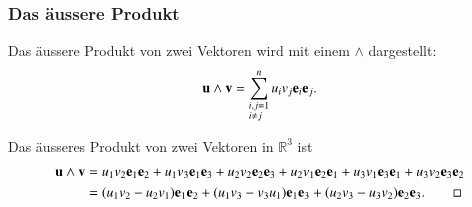 \subsubsection{Das äussere Produkt}
Das äussere Produkt von zwei Vektoren wird mit einem $\wedge$ dargestellt:
\begin{equation*}
    \textbf{u}\wedge \textbf{v} 
    = 
    \sum_{\begin{subarray}{l}i,j=1\\i \neq j\end{subarray}}^n  u_iv_j\textbf{e}_i\textbf{e}_j .
\end{equation*}
\begin{beispiel}
Das äusseres Produkt von zwei Vektoren in $\mathbb{R}^3$ ist
\begin{align*}
		\textbf{u} \wedge \textbf{v}
		&= 
		u_1v_2\textbf{e}_1\textbf{e}_2 
		+ 
		u_1v_3\textbf{e}_1\textbf{e}_3 
		+ 
		u_2v_2\textbf{e}_2\textbf{e}_3 
		+ 
		u_2v_1\textbf{e}_2\textbf{e}_1 
		+ 
		u_3v_1\textbf{e}_3\textbf{e}_1 
		+
		u_3v_2\textbf{e}_3\textbf{e}_2 \\\ 
		&= 
		(u_1v_2 - u_2v_1)\textbf{e}_1\textbf{e}_2 
		+ 
		(u_1v_3 - v_3u_1)\textbf{e}_1\textbf{e}_3 
		+ 
		(u_2v_3 - u_3v_2)\textbf{e}_2\textbf{e}_3.
\qedhere
\end{align*}
\end{beispiel}

